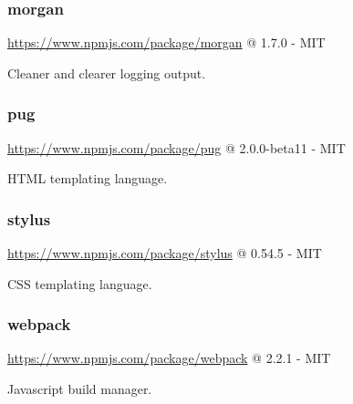 \subsubsection*{morgan}

\url{https://www.npmjs.com/package/morgan} @ 1.7.0 - MIT

Cleaner and clearer logging output.

\subsubsection*{pug}

\url{https://www.npmjs.com/package/pug} @ 2.0.0-beta11 - MIT

HTML templating language.

\subsubsection*{stylus}

\url{https://www.npmjs.com/package/stylus} @ 0.54.5 - MIT

CSS templating language.

\subsubsection*{webpack}

\url{https://www.npmjs.com/package/webpack} @ 2.2.1 - MIT

Javascript build manager.






